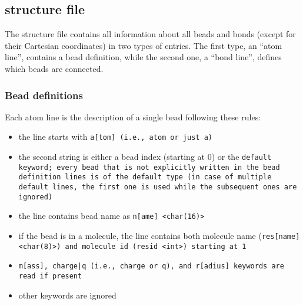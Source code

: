 \subsection{\vsf structure file} \label{ssec:StructureVsf} %

The structure file contains all information about all beads and bonds
(except for their Cartesian coordinates) in two types of entries. The first
type, an \enquote{atom line}, contains a bead definition, while the second
one, a \enquote{bond line}, defines which beads are connected.

\subsubsection{Bead definitions}
Each atom line is the description of a single bead following these rules:

\begin{itemize}[topsep=0pt,itemsep=0pt]
  \item the line starts with \tt{a[tom]} (i.e., \tt{atom} or just \tt{a})
  \item the second string is either a bead index (starting at 0) or the
    \tt{default} keyword; every bead that is not explicitly written in the
    bead definition lines is of the \tt{default} type (in case of multiple
    \tt{default} lines, the first one is used while the subsequent ones are
    ignored)
  \item the line contains bead name as \tt{n[ame] <char(16)>}
  \item if the bead is in a molecule, the line contains both molecule name
    (\tt{res[name] <char(8)>}) and molecule id (\tt{resid <int>}) starting
    at 1
  \item \tt{m[ass]}, \tt{charge|q} (i.e., \tt{charge} or \tt{q}), and
    \tt{r[adius]} keywords are read if present
  \item other keywords are ignored
\end{itemize}


